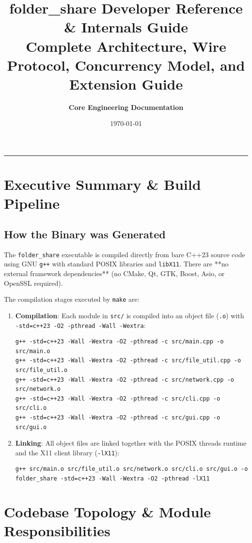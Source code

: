 \documentclass[11pt,a4paper]{article}
\title{\textbf{\Huge folder\_share Developer Reference \& Internals Guide}\\[0.3em]
\Large Complete Architecture, Wire Protocol, Concurrency Model, and Extension Guide}
\author{\textbf{Core Engineering Documentation}}
\date{\today}
\begin{document}
\maketitle
\tableofcontents
\vspace{1.5em}
\hrule
\vspace{1.5em}

\section{Executive Summary \& Build Pipeline}

\subsection{How the Binary was Generated}
The \texttt{folder\_share} executable is compiled directly from bare C++23 source code using GNU \texttt{g++} with standard POSIX libraries and \texttt{libX11}. There are **no external framework dependencies** (no CMake, Qt, GTK, Boost, Asio, or OpenSSL required).

The compilation stages executed by \texttt{make} are:
\begin{enumerate}
    \item \textbf{Compilation}: Each module in \texttt{src/} is compiled into an object file (\texttt{.o}) with \texttt{-std=c++23 -O2 -pthread -Wall -Wextra}:
    \begin{lstlisting}[style=bashblock]
g++ -std=c++23 -Wall -Wextra -O2 -pthread -c src/main.cpp -o src/main.o
g++ -std=c++23 -Wall -Wextra -O2 -pthread -c src/file_util.cpp -o src/file_util.o
g++ -std=c++23 -Wall -Wextra -O2 -pthread -c src/network.cpp -o src/network.o
g++ -std=c++23 -Wall -Wextra -O2 -pthread -c src/cli.cpp -o src/cli.o
g++ -std=c++23 -Wall -Wextra -O2 -pthread -c src/gui.cpp -o src/gui.o
    \end{lstlisting}
    \item \textbf{Linking}: All object files are linked together with the POSIX threads runtime and the X11 client library (\texttt{-lX11}):
    \begin{lstlisting}[style=bashblock]
g++ src/main.o src/file_util.o src/network.o src/cli.o src/gui.o -o folder_share -std=c++23 -Wall -Wextra -O2 -pthread -lX11
    \end{lstlisting}
\end{enumerate}

\section{Codebase Topology \& Module Responsibilities}
\end{document}
